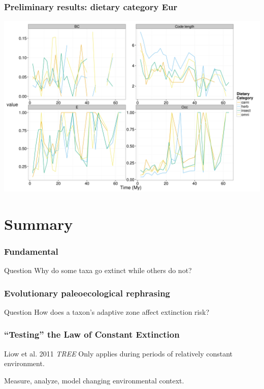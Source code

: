 \documentclass{beamer}
\begin{document}
\begin{frame}
  \frametitle{Preliminary results: dietary category Eur}

  \begin{center}
    \includegraphics[height = 0.8\textheight, width = \textwidth, keepaspectratio = true]{figure/er_dt}
  \end{center}
\end{frame}


\section{Summary}

\begin{frame}
  \frametitle{Fundamental}

  \begin{alertblock}{Question}
    Why do some taxa go extinct while others do not?
  \end{alertblock}
\end{frame}

\begin{frame}
  \frametitle{Evolutionary paleoecological rephrasing}

  \begin{block}{Question}
    How does a taxon's adaptive zone affect extinction risk?
  \end{block}
\end{frame}

\begin{frame}
  \frametitle{``Testing'' the Law of Constant Extinction}

  \begin{block}{Liow et al. 2011 \textit{TREE}}
    Only applies during periods of relatively \alert{constant} environment.
  \end{block}

  \vspace{1cm}

  \begin{center}
    Measure, analyze, model changing environmental context.
  \end{center}
\end{frame}
\end{document}
